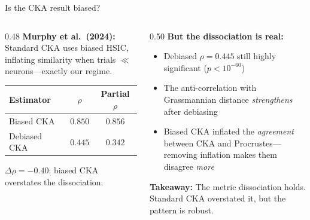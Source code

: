 \documentclass[aspectratio=169,11pt]{beamer}
\begin{document}
\begin{frame}{Is the CKA result biased?}
\begin{columns}[T]
\begin{column}{0.48\textwidth}
\textbf{Murphy et al.\ (2024):}\\[0.2em]
{\small Standard CKA uses biased HSIC, inflating similarity when trials $\ll$ neurons---exactly our regime.}

\vspace{0.5em}
\centering
{\small
\begin{tabular}{lcc}
\toprule
\textbf{Estimator} & \textbf{$\rho$} & \textbf{Partial $\rho$} \\
\midrule
Biased CKA & $0.850$ & $0.856$ \\
Debiased CKA & $\mathbf{0.445}$ & $\mathbf{0.342}$ \\
\bottomrule
\end{tabular}
}

\vspace{0.3em}
{\small $\Delta\rho = -0.40$: biased CKA overstates the dissociation.}
\end{column}
\begin{column}{0.50\textwidth}
\textbf{But the dissociation is real:}\\[0.3em]
{\small
\begin{itemize}\setlength\itemsep{3pt}
  \item Debiased $\rho = 0.445$ still highly significant ($p < 10^{-60}$)
  \item The anti-correlation with Grassmannian distance \emph{strengthens} after debiasing
  \item Biased CKA inflated the \emph{agreement} between CKA and Procrustes---removing inflation makes them disagree \emph{more}
\end{itemize}
}

\vspace{0.3em}
{\small \textbf{Takeaway:} The metric dissociation holds. Standard CKA overstated it, but the pattern is robust.}
\end{column}
\end{columns}
\end{frame}
\end{document}
